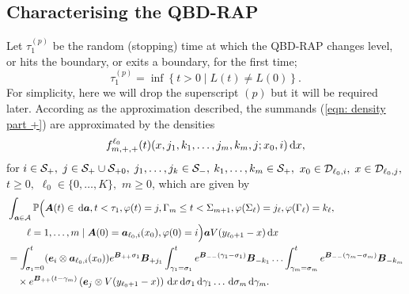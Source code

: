 \subsection{Characterising the QBD-RAP} 
Let \(\tau_1^{(p)}\) be the random (stopping) time at which the QBD-RAP changes level, or hits the boundary, or exits a boundary, for the first time;
\[\tau_1^{(p)} = \inf\left\{t>0\mid L(t)\neq L(0)\right\}.\]
For simplicity, here we will drop the superscript \((p)\) but it will be required later. According as the approximation described, the summands (\ref{eqn: density part +}) are approximated by the densities \[f^{\ell_0}_{m,+,+}(t)( x, j_1,k_1,\dots,j_m,k_m, j; x_0,i)\, \mathrm{d} x,\] 
for \(i\in\mathcal{S}_+,\) \(j\in\mathcal{S}_+\cup\mathcal{S}_{+0},\) \( j_1,\dots,j_k\in\mathcal{S}_-,\) \(k_1,\dots,k_m\in\mathcal{S}_+,\) \(x_0\in\mathcal{D}_{\ell_0,i},\) \(x\in\mathcal{D}_{\ell_0,j},\) \(t\geq0,\) \(\ell_0\in\{0,\dots,K\},\) \(m\geq 0\), which are given by
\begin{align}
	&\int_{\boldsymbol a \in\mathcal A}\mathbb P\Big(\boldsymbol A(t)\in \, \mathrm{d} \boldsymbol a, t<\tau_1, \varphi(t) = j, \Gamma_m\leq t<\Sigma_{m+1}, \nonumber
	\varphi(\Sigma_\ell) = j_\ell , \varphi(\Gamma_\ell) = k_\ell, 
	\\&\qquad \ell = 1,\dots,m \mid 
	\boldsymbol A(0) = \boldsymbol   a_{\ell_0,i}(x_0), \varphi(0) = i\Big)\boldsymbol aV(y_{\ell_0+1}-x)\, \mathrm{d} x\nonumber
	\\
	&=\int_{\sigma_1=0}^t (\boldsymbol e_i\otimes \boldsymbol  a_{\ell_0,i}(x_0)) e^{\boldsymbol{B}_{++}\sigma_1}\boldsymbol{B}_{+{j_1}}	\nonumber
	\int_{\gamma_1=\sigma_1}^{t} e^{\boldsymbol{B}_{--}(\gamma_1-\sigma_1)}\boldsymbol{B}_{-{k_1}}
	\hdots 
	 \int_{\gamma_m=\sigma_{m}}^{t} e^{\boldsymbol{B}_{--}(\gamma_m-\sigma_{m})}\boldsymbol{B}_{-{k_m}}\\&\quad\times
	e^{\boldsymbol{B}_{++}(t-\gamma_m)}\left(\boldsymbol e_j  \otimes V(y_{\ell_0+1}-x)\right)\, \mathrm{d} x
	\, \mathrm{d} \sigma_1\, \mathrm{d} \gamma_1\dots \, \mathrm{d} \sigma_m\, \mathrm{d} \gamma_m. \label{eqn: approx end conv}
\end{align}
